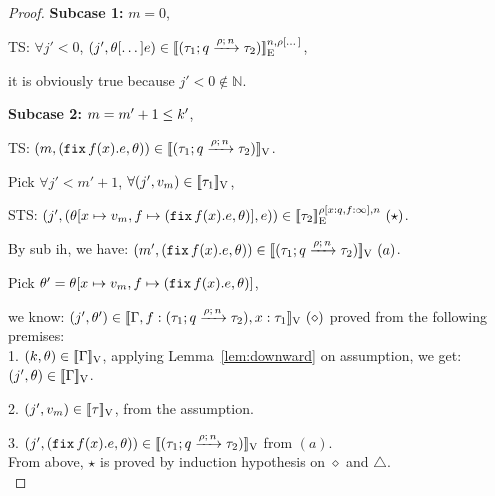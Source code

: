 \documentclass[a4paper,11pt]{article}
\theoremstyle{definition}
\begin{document}
\begin{proof}
{\bf Subcase 1:} $m = 0$,

	TS: $\forall j' < 0$, $(j', \env[\dots] \expr) \in \lre{\nnatA}{\dmap[\dots]}{(\tarr{\type_1}{\type_2}{\nnatbiA}{\dmap}{\nnatA})}$,
	
	it is obviously true because $j' < 0 \notin \mathbb{N}$.

{\bf Subcase 2:} $m = m' + 1 \leq \stepiA'$, 

	TS: $ (m, (\efix f(x). \expr, \env)) \in \lrv{(\tarr{\type_1}{\type_2}{\nnatbiA}{\dmap}{\nnatA})}$.

	Pick $\forall j' < m' + 1$, $\forall (j', \valr_m) \in \lrv{\type_1}$,
	
	STS: $(j', (\env[x \mapsto \valr_m, f \mapsto (\efix f(x).\expr, \env)], \expr)) \in \lre{\dmap[x: \nnatbiA, f: \infty]}{\nnatA}{\type_2} ~ (\star)$.
	
	By sub ih, we have:
	$(m', (\efix f(x). \expr, \env)) \in \lrv{(\tarr{\type_1}{\type_2}{\nnatbiA}{\dmap}{\nnatA})} ~ (a)$.

	Pick $\env' = \env[x \mapsto \valr_m, f \mapsto (\efix f(x).\expr, \env)]$,
	
	we know: $(j', \env') \in \lrv{\Gamma,
          f:(\tarr{\type_1}{\type_2}{\nnatbiA}{\dmap}{\nnatA}),  x:
          \type_1} ~ (\diamond)$ proved from the following premises:\\ 
	
	1. $ (\stepiA, \env) \in \lrv{\Gamma}$, applying Lemma~\ref{lem:downward} on assumption, we get: $(j', \env) \in \lrv{\Gamma}$.
	
	2. $(j', \valr_m) \in \lrv{\type}$, from the assumption.
	
	3. $(j', (\efix f(x). \expr, \env)) \in \lrv{(\tarr{\type_1}{\type_2}{\nnatbiA}{\dmap}{\nnatA})}$ from $(a)$.\\
%
From above, $\star$ is proved by induction hypothesis on $\diamond$ and $\triangle$.\\
%



\end{proof}
\end{document}
